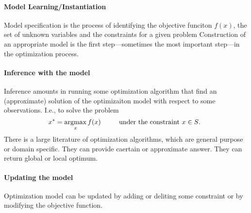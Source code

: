   \paragraph{Model Learning/Instantiation}
  Model specification is the process of identifying the objective
  funciton $f(x)$, the set of unknown variables and the constraints
  for a given problem Construction of an appropriate model is the
  first step---sometimes the most important step---in the optimization
  process.
          
  \paragraph{Inference with the model}
  Inference amounts in running some optimization algorithm that find
  an (approximate) solution of the optimizaiton model with respect  to
  some observations. I.e., to solve the problem
  $$
  x^* = \operatorname*{argmax}_x f(x)  \ \ \ \ \ \ \ \ \mbox{under the constraint
    $x\in S$. }
    $$
  There is a large literature of optimization algorithms, which are
  general purpose or domain specific. They can provide caertain or
  approximate answer. They can return global or local optimum. 
    
  \paragraph{Updating the model}
  Optimization model can be updated by adding or deliting some
  constraint or by modifying the objective function. 

